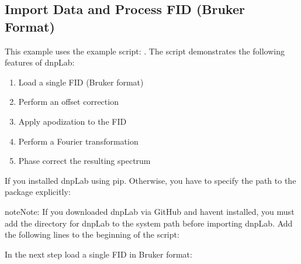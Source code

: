 \documentclass[letterpaper,10pt,english]{sphinxmanual}
\begin{document}
\subsection{Import Data and Process FID (Bruker Format)}
\label{\detokenize{examples:import-data-and-process-fid-bruker-format}}
This example uses the example script: . The script demonstrates the following features of dnpLab:
\begin{enumerate}
%
\item {} 
Load a single FID (Bruker format)

\item {} 
Perform an offset correction

\item {} 
Apply apodization to the FID

\item {} 
Perform a Fourier transformation

\item {} 
Phase correct the resulting spectrum

\end{enumerate}

If you installed dnpLab using pip. Otherwise, you have to specify the path to the package explicitly:

\begin{sphinxVerbatim}[commandchars=\\\{\}]
   
   
\end{sphinxVerbatim}

\begin{sphinxadmonition}{note}{Note:}
If you downloaded dnpLab via GitHub and haven\textquotesingle{}t installed, you must add the directory for dnpLab to the system path before importing dnpLab. Add the following lines to the beginning of the script:

\begin{sphinxVerbatim}[commandchars=\\\{\}]
 
\end{sphinxVerbatim}
\end{sphinxadmonition}

In the next step load a single FID in Bruker format:
\end{document}
